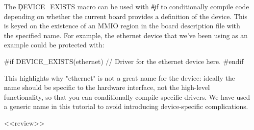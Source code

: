The \c{DEVICE_EXISTS} macro can be used with \c{#if} to conditionally compile code depending on whether the current board provides a definition of the device.
This is keyed on the existence of an MMIO region in the board description file with the specified name.
For example, the ethernet device that we've been using as an example could be protected with:

\begin{cxxsnippet}
#if DEVICE_EXISTS(ethernet)
// Driver for the ethernet device here.
#endif
\end{cxxsnippet}

\begin{note}
This highlights why "ethernet" is not a great name for the device: ideally the name should be specific to the hardware interface, not the high-level functionality, so that you can conditionally compile specific drivers.
We have used a generic name in this tutorial to avoid introducing device-specific complications.
\end{note}
<<review>>
